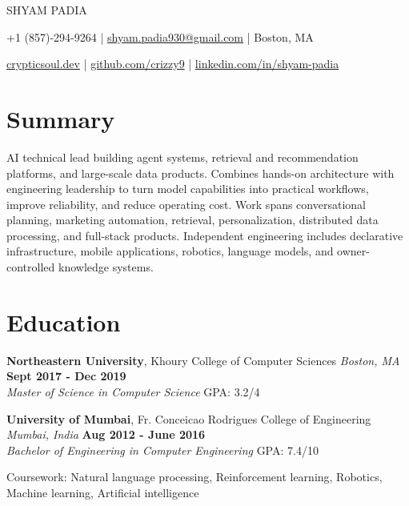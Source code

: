 \documentclass[10pt, letterpaper]{article}
\newcommand{\name}[1]{\centerline{\Large \scshape {#1}}}
\newcommand{\contactinfo}[1]{\centerline{\small #1}}
\newcommand{\educationentry}[4]{
  \noindent\textbf{#1}, #2 \hfill \textit{#3} \hfill \textbf{#4}
}
\begin{document}
\name{SHYAM PADIA}
\contactinfo{
	+1 (857)-294-9264 |
	\href{mailto:shyam.padia930@gmail.com}{shyam.padia930@gmail.com} |
	Boston, MA
}
\contactinfo{
	\href{https://crypticsoul.dev}{crypticsoul.dev} |
	\href{https://github.com/crizzy9}{github.com/crizzy9} |
	\href{https://linkedin.com/in/shyam-padia}{linkedin.com/in/shyam-padia}
}

\section{Summary}
AI technical lead building agent systems, retrieval and recommendation platforms, and large-scale data products. Combines hands-on architecture with engineering leadership to turn model capabilities into practical workflows, improve reliability, and reduce operating cost. Work spans conversational planning, marketing automation, retrieval, personalization, distributed data processing, and full-stack products. Independent engineering includes declarative infrastructure, mobile applications, robotics, language models, and owner-controlled knowledge systems.

\section{Education}

\educationentry{Northeastern University}{Khoury College of Computer Sciences}{Boston, MA}{Sept 2017 - Dec 2019}\\
\textit{Master of Science in Computer Science} \hfill GPA: 3.2/4

\educationentry{University of Mumbai}{Fr. Conceicao Rodrigues College of Engineering}{Mumbai, India}{Aug 2012 - June 2016}\\
\textit{Bachelor of Engineering in Computer Engineering} \hfill GPA: 7.4/10

\noindent Coursework: Natural language processing, Reinforcement learning, Robotics, Machine learning, Artificial intelligence
\end{document}
